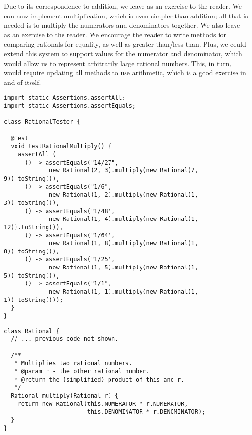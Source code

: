 Due to its correspondence to addition, we leave  as an exercise to the reader. 
We can now implement multiplication, which is even simpler than addition; all that is needed is to multiply the numerators and denominators together. 
We also leave  as an exercise to the reader. 
We encourage the reader to write methods for comparing rationals for equality, as well as greater than/less than. 
Plus, we could extend this system to support  values for the numerator and denominator, which would allow us to represent arbitrarily large rational numbers. 
This, in turn, would require updating all methods to use  arithmetic, which is a good exercise in and of itself.

\begin{lstlisting}[language=MyJava]
import static Assertions.assertAll;
import static Assertions.assertEquals;

class RationalTester {

  @Test
  void testRationalMultiply() {
    assertAll (
      () -> assertEquals("14/27", 
             new Rational(2, 3).multiply(new Rational(7, 9)).toString()),
      () -> assertEquals("1/6", 
             new Rational(1, 2).multiply(new Rational(1, 3)).toString()),
      () -> assertEquals("1/48", 
             new Rational(1, 4).multiply(new Rational(1, 12)).toString()),
      () -> assertEquals("1/64", 
             new Rational(1, 8).multiply(new Rational(1, 8)).toString()),
      () -> assertEquals("1/25", 
             new Rational(1, 5).multiply(new Rational(1, 5)).toString()),
      () -> assertEquals("1/1", 
             new Rational(1, 1).multiply(new Rational(1, 1)).toString()));
  }
}
\end{lstlisting}

\begin{lstlisting}[language=MyJava]
class Rational {
  // ... previous code not shown.

  /**
   * Multiplies two rational numbers.
   * @param r - the other rational number.
   * @return the (simplified) product of this and r.
   */
  Rational multiply(Rational r) {
    return new Rational(this.NUMERATOR * r.NUMERATOR, 
                        this.DENOMINATOR * r.DENOMINATOR);
  }
}
\end{lstlisting}


